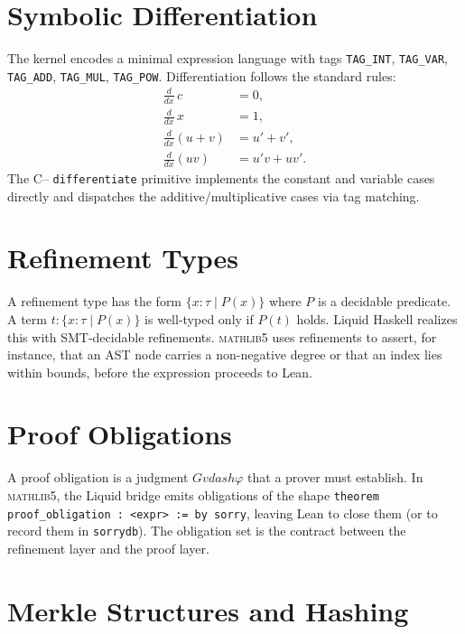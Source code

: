 \section{Symbolic Differentiation}
\label{sec:pre-diff}

The kernel encodes a minimal expression language with tags
\texttt{TAG\_INT}, \texttt{TAG\_VAR}, \texttt{TAG\_ADD}, \texttt{TAG\_MUL},
\texttt{TAG\_POW}. Differentiation follows the standard rules:
\begin{align}
\frac{d}{dx}\,c &= 0, \\
\frac{d}{dx}\,x &= 1, \\
\frac{d}{dx}(u+v) &= u' + v', \\
\frac{d}{dx}(uv) &= u'v + uv'.
\end{align}
The C{--} \texttt{differentiate} primitive implements the constant and
variable cases directly and dispatches the additive/multiplicative cases via
tag matching.

\section{Refinement Types}
\label{sec:pre-refinement}

A refinement type has the form $\{x : \tau \mid P(x)\}$ where $P$ is a
decidable predicate. A term $t : \{x:\tau\mid P(x)\}$ is well-typed only if
$P(t)$ holds. Liquid Haskell realizes this with SMT-decidable refinements.
\textsc{mathlib5} uses refinements to assert, for instance, that an AST node
carries a non-negative degree or that an index lies within bounds, before the
expression proceeds to Lean.

\section{Proof Obligations}
\label{sec:pre-po}

A proof obligation is a judgment $G \ensuremath{vdash} \varphi$ that a prover must
establish. In \textsc{mathlib5}, the Liquid bridge emits obligations of the
shape \texttt{theorem proof\_obligation : <expr> := by sorry}, leaving Lean to
close them (or to record them in \texttt{sorrydb}). The obligation set is the
contract between the refinement layer and the proof layer.

\section{Merkle Structures and Hashing}
\label{sec:pre-merkle}

